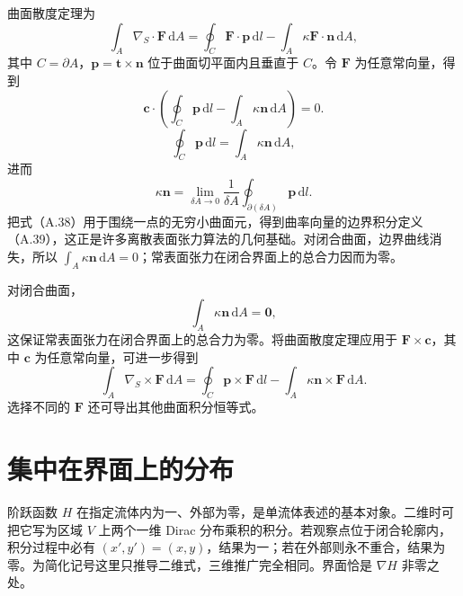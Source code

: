 \documentclass[11pt,a4paper,openany,fontset=none]{ctexbook}
\begin{document}
曲面散度定理为
\begin{equation}
 \int_A\nabla_S\cdot\bm F\,\mathrm dA
 =\oint_C\bm F\cdot\bm p\,\mathrm dl-
 \int_A\kappa\bm F\cdot\bm n\,\mathrm dA, \tag{A.36}
\end{equation}
其中 $C=\partial A$，$\bm p=\bm t\times\bm n$ 位于曲面切平面内且垂直于 $C$。令 $\bm F$ 为任意常向量，得到
\begin{equation}
 \bm c\cdot\left(\oint_C\bm p\,\mathrm dl-\int_A\kappa\bm n\,\mathrm dA\right)=0. \tag{A.37}
\end{equation}
\begin{equation}
 \oint_C\bm p\,\mathrm dl=\int_A\kappa\bm n\,\mathrm dA, \tag{A.38}
\end{equation}
进而
\begin{equation}
 \kappa\bm n=\lim_{\delta A\to0}\frac1{\delta A}\oint_{\partial(\delta A)}\bm p\,\mathrm dl. \tag{A.39}
\end{equation}
把式（A.38）用于围绕一点的无穷小曲面元，得到曲率向量的边界积分定义（A.39），这正是许多离散表面张力算法的几何基础。对闭合曲面，边界曲线消失，所以 $\int_A\kappa\bm n\,\mathrm dA=0$；常表面张力在闭合界面上的总合力因而为零。

对闭合曲面，
\begin{equation}
 \int_A\kappa\bm n\,\mathrm dA=\bm0, \tag{A.40}
\end{equation}
这保证常表面张力在闭合界面上的总合力为零。将曲面散度定理应用于 $\bm F\times\bm c$，其中 $\bm c$ 为任意常向量，可进一步得到
\begin{equation}
 \int_A\nabla_S\times\bm F\,\mathrm dA
 =\oint_C\bm p\times\bm F\,\mathrm dl-
 \int_A\kappa\bm n\times\bm F\,\mathrm dA. \tag{A.41}
\end{equation}
选择不同的 $\bm F$ 还可导出其他曲面积分恒等式。

\chapter{集中在界面上的分布}
阶跃函数 $H$ 在指定流体内为一、外部为零，是单流体表述的基本对象。二维时可把它写为区域 $V$ 上两个一维 Dirac 分布乘积的积分。若观察点位于闭合轮廓内，积分过程中必有 $(x',y')=(x,y)$，结果为一；若在外部则永不重合，结果为零。为简化记号这里只推导二维式，三维推广完全相同。界面恰是 $\nabla H$ 非零之处。
\end{document}
